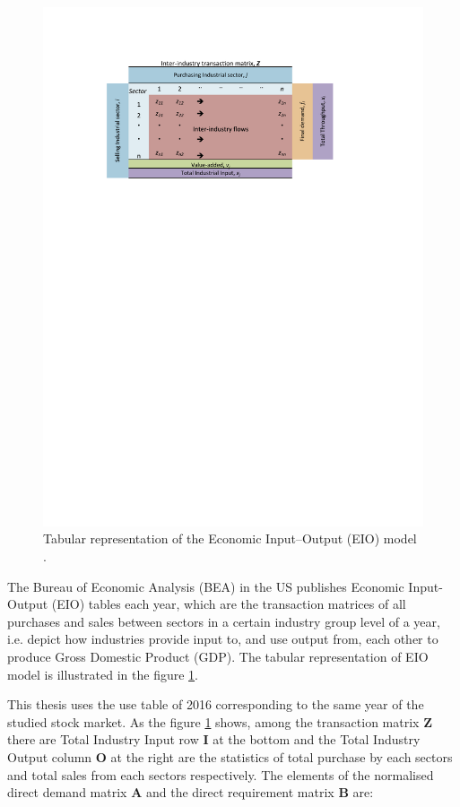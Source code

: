\begin{figure}
	\begin{center}
		\includegraphics[width=14cm]{EIO_model}
	\end{center}
	\caption{Tabular representation of the Economic Input–Output (EIO) model \cite{CHOPRA2015865}.}
	\label{fig:EIO_model}
\end{figure}

The Bureau of Economic Analysis (BEA) in the US publishes Economic Input-Output (EIO) tables each year, which are the transaction matrices of all purchases and sales between sectors in a certain industry group level of a year, i.e. depict how industries provide input to, and use output from, each other to produce Gross Domestic Product (GDP). The tabular representation of EIO model is illustrated in the figure \ref{fig:EIO_model}.

This thesis uses the use table of 2016 corresponding to the same year of the studied stock market. As the figure \ref{fig:EIO_model} shows, among the transaction matrix \textbf{Z} there are Total Industry Input row \textbf{I} at the bottom and the Total Industry Output column \textbf{O} at the right are the statistics of total purchase by each sectors and total sales from each sectors respectively. The elements of the normalised direct demand matrix \textbf{A} and the direct requirement matrix \textbf{B} are:

